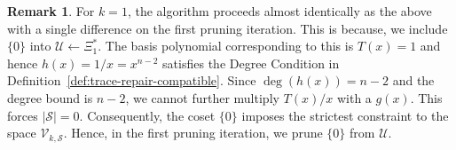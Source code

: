 \documentclass[onecolumn]{IEEEtran}
\theoremstyle{plain}
\theoremstyle{definition}
\newtheorem{remark}[definition]{Remark}
\newcommand{\cS}{\mathcal{S}}
\newcommand{\cU}{\mathcal{U}}
\newcommand{\cV}{\mathcal{V}}
\begin{document}

\begin{remark}
    For $k = 1$, the algorithm proceeds almost identically as the above with a single difference on the first pruning iteration. This is because, we include $\{0\}$ into $\cU \leftarrow \Xi_1^*$. The basis polynomial corresponding to this is $T(x) = 1$ and hence $h(x) = 1/x = x^{n-2}$ satisfies the Degree Condition in Definition~\ref{def:trace-repair-compatible}. Since $\deg(h(x)) = n-2$ and the degree bound is $n-2$, we cannot further multiply $T(x)/x$ with a $g(x)$. This forces $|\cS| = 0$. Consequently, the coset $\{0\}$ imposes the strictest constraint to the space $\cV_{k,\cS}$. Hence, in the first pruning iteration, we prune $\{0\}$ from $\cU$.
\end{remark}
\end{document}
